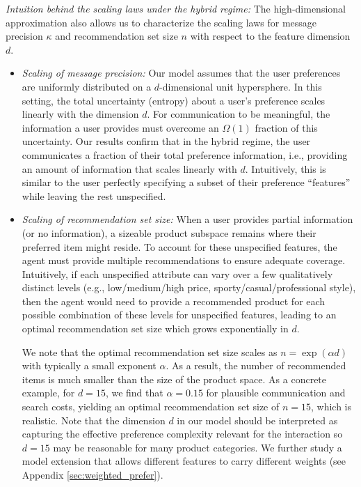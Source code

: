 \documentclass[12pt]{article}
\theoremstyle{definition}
\theoremstyle{remark}
\begin{document}
\textit{Intuition behind the scaling laws under the hybrid regime:} The high-dimensional approximation also allows us to characterize the scaling laws for message precision $\kappa$ and recommendation set size $n$ with respect to the feature dimension $d$.
\begin{itemize}
    \item \textit{Scaling of message precision:} Our model assumes that the user preferences are uniformly distributed on a $d$-dimensional unit hypersphere.
    In this setting, the total uncertainty (entropy) about a user's preference scales linearly with the dimension $d$. For communication to be meaningful, the information a user provides must overcome an $\Omega(1)$ fraction of this uncertainty. Our results confirm that in the hybrid regime, the user communicates a fraction of their total preference information, i.e., providing an amount of information that scales linearly with $d$. Intuitively, this is similar to the user perfectly specifying a subset of their preference ``features'' while leaving the rest unspecified.

    \item \textit{Scaling of recommendation set size:} When a user provides partial information (or no information), a sizeable product subspace remains where their preferred item might reside.
    To account for these unspecified features, the agent must provide multiple recommendations to ensure adequate coverage. Intuitively, if each unspecified attribute can vary over a few qualitatively distinct levels (e.g., low/medium/high price, sporty/casual/professional style), then the agent would need to provide a recommended product for each possible combination of these levels for unspecified features, leading to an optimal recommendation set size which grows exponentially in $d$.

    We note that the optimal recommendation set size scales as $n = \exp(\alpha d)$ with typically a small exponent $\alpha$. As a result, the number of recommended items is much smaller than the size of the product space. As a concrete example, for $d=15$, we find that $\alpha = 0.15$ for plausible communication and search costs, yielding an optimal recommendation set size of $n = 15$, which is realistic. Note that the dimension $d$ in our model should be interpreted as capturing the effective preference complexity relevant for the interaction so $d=15$ may be reasonable for many product categories. We further study a model extension that allows different features to carry different weights (see Appendix \ref{sec:weighted_prefer}).
\end{itemize}
\end{document}
